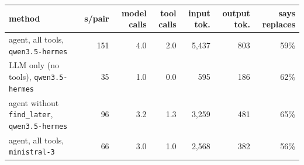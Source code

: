 \begin{tabular}{lrrrrrr}
\toprule
method & s/pair & model calls & tool calls & input tok. & output tok. & says replaces \\
\midrule
agent, all tools, \texttt{qwen3.5-hermes} & 151 & 4.0 & 2.0 & 5,437 & 803 & 59\% \\
LLM only (no tools), \texttt{qwen3.5-hermes} & 35 & 1.0 & 0.0 & 595 & 186 & 62\% \\
agent without \texttt{find\_later}, \texttt{qwen3.5-hermes} & 96 & 3.2 & 1.3 & 3,259 & 481 & 65\% \\
agent, all tools, \texttt{ministral-3} & 66 & 3.0 & 1.0 & 2,568 & 382 & 56\% \\
\bottomrule
\end{tabular}
